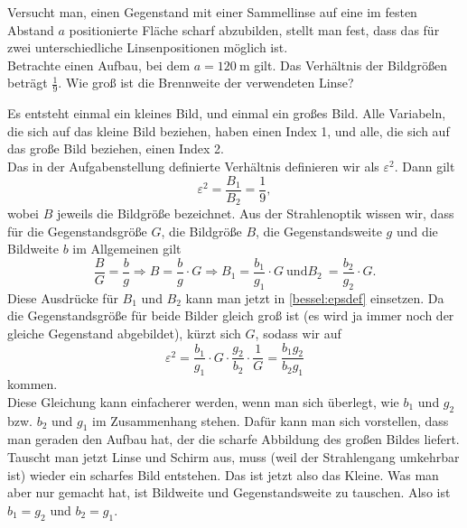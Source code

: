 \begin{Exercise}[label = ipho20170402, title = Zwei Linsenpositionen , difficulty = 3, origin = 4. Runde IPhO 2017 ]
Versucht man, einen Gegenstand mit einer Sammellinse auf eine im festen Abstand $a$ positionierte Fläche scharf abzubilden, stellt man fest, dass das für zwei unterschiedliche Linsenpositionen möglich ist.\\
Betrachte einen Aufbau, bei dem $a= 120~\mathrm{m}$ gilt. Das Verhältnis der Bildgrößen beträgt $\frac{1}{9}$. Wie groß ist die Brennweite der verwendeten Linse? 
\end{Exercise}	
\begin{Answer}[ref = ipho20170402]
	Es entsteht einmal ein kleines Bild, und einmal ein großes Bild. Alle Variabeln, die sich auf das kleine Bild beziehen, haben einen Index 1, und alle, die sich auf das große Bild beziehen, einen Index 2.\\
	Das in der Aufgabenstellung definierte Verhältnis definieren wir als $\varepsilon^2$. Dann gilt
	\begin{equation}\label{bessel:epsdef}
		\varepsilon^2=\frac{B_1}{B_2} = \frac{1}{9},
	\end{equation}
	wobei $B$ jeweils die Bildgröße bezeichnet. Aus der Strahlenoptik wissen wir, dass für die Gegenstandsgröße $G$, die Bildgröße $B$, die Gegenstandsweite $g$ und die Bildweite $b$ im Allgemeinen gilt
	\begin{equation*}
		\frac{B}{G} = \frac{b}{g} \Rightarrow B = \frac{b}{g}\cdot G \Rightarrow B_1 = \frac{b_1}{g_1}\cdot G~\mathrm{und} B_2 ~= \frac{b_2}{g_2}\cdot G.
	\end{equation*}
	Diese Ausdrücke für $B_1$ und $B_2$ kann man jetzt in \eqref{bessel:epsdef} einsetzen. Da die Gegenstandsgröße für beide Bilder gleich groß ist (es wird ja immer noch der  gleiche Gegenstand abgebildet), kürzt sich $G$, sodass wir auf
	\begin{equation}\label{bessel:masss}
		\varepsilon^2 = \frac{b_1}{g_1}\cdot G \cdot \frac{g_2}{b_2}\cdot \frac{1}{G} = \frac{b_1 g_2}{b_2 g_1} 
	\end{equation}	
	kommen.\\
	Diese Gleichung kann einfacherer werden, wenn man sich überlegt, wie $b_1$ und $g_2$ bzw. $b_2$ und $g_1$ im Zusammenhang stehen. Dafür kann man sich vorstellen, dass man geraden den Aufbau hat, der die scharfe Abbildung des großen Bildes liefert. Tauscht man jetzt Linse und Schirm aus, muss (weil der Strahlengang umkehrbar ist) wieder ein scharfes Bild entstehen. Das ist jetzt also das Kleine. Was man aber nur gemacht hat, ist Bildweite und Gegenstandsweite zu tauschen. Also ist $b_1 = g_2$ und $b_2 = g_1$. \\

\end{Answer}
